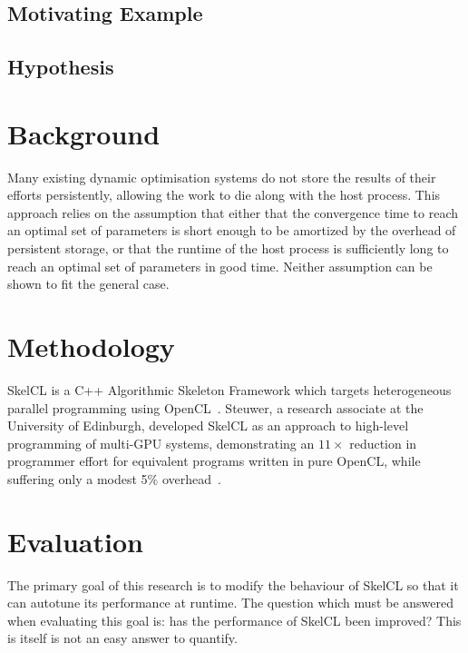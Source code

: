 \subsection{Motivating Example}

\subsection{Hypothesis}

\section{Background}

Many existing dynamic optimisation systems do not store the results of
their efforts persistently, allowing the work to die along with the
host process. This approach relies on the assumption that either that
the convergence time to reach an optimal set of parameters is short
enough to be amortized by the overhead of persistent storage, or that
the runtime of the host process is sufficiently long to reach an
optimal set of parameters in good time. Neither assumption can be
shown to fit the general case.

\section{Methodology}

SkelCL is a C++ Algorithmic Skeleton Framework which targets
heterogeneous parallel programming using OpenCL~\cite{Steuwer2011,
Steuwer2013a}. Steuwer, a research associate at the University of
Edinburgh, developed SkelCL as an approach to high-level programming
of multi-GPU systems, demonstrating an $11\times$ reduction in
programmer effort for equivalent programs written in pure OpenCL,
while suffering only a modest 5\% overhead~\cite{Steuwer2012}.

\section{Evaluation}

The primary goal of this research is to modify the behaviour of SkelCL
so that it can autotune its performance at runtime. The question which
must be answered when evaluating this goal is: has the performance of
SkelCL been improved? This is itself is not an easy answer to
quantify.

\cite{Georges2007}


